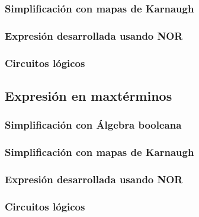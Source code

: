 \subsubsection{Simplificación con mapas de Karnaugh}

\subsubsection{Expresión desarrollada usando NOR}

\subsubsection{Circuitos lógicos}

\subsection{Expresi\'on en maxt\'erminos}

\subsubsection{Simplificación con Álgebra booleana}

\subsubsection{Simplificación con mapas de Karnaugh}

\subsubsection{Expresión desarrollada usando NOR}

\subsubsection{Circuitos lógicos}
